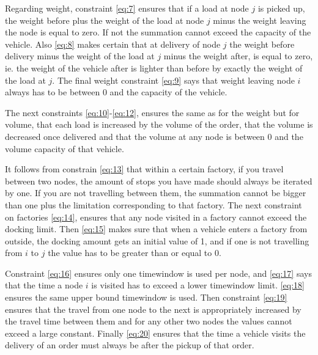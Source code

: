 \documentclass[../main.tex]{subfiles}
\begin{document}
Regarding weight, constraint \ref{eq:7} ensures that if a load at node $j$ is picked up, the weight before plus the weight of the load at node $j$ minus the weight leaving the node is equal to zero. If not the summation cannot exceed the capacity of the vehicle.
Also \ref{eq:8} makes certain that at delivery of node $j$ the weight before delivery minus the weight of the load at $j$ minus the weight after, is equal to zero, ie. the weight of the vehicle after is lighter than before by exactly the weight of the load at $j$. 
The final weight constraint \ref{eq:9} says that weight leaving node $i$ always has to be between $0$ and the capacity of the vehicle. \par

The next constraints \ref{eq:10}-\ref{eq:12}, ensures the same as for the weight but for volume, that each load is increased by the volume of the order, that the volume is decreased once delivered and that the volume at any node is between $0$ and the volume capacity of that vehicle.

It follows from constrain \ref{eq:13} that within a certain factory, if you travel between two nodes, the amount of stops you have made should always be iterated by one. 
If you are not travelling between them, the summation cannot be bigger than one plus the limitation corresponding to that factory.
The next constraint on factories \ref{eq:14}, ensures that any node visited in a factory cannot exceed the docking limit.
Then \ref{eq:15} makes sure that when a vehicle enters a factory from outside, the docking amount gets an initial value of 1, and if one is not travelling from $i$ to $j$ the value has to be greater than or equal to 0. \par

Constraint \ref{eq:16} ensures only one timewindow is used per node, and \ref{eq:17} says that the time a node $i$ is visited has to exceed a lower timewindow limit.
\ref{eq:18} ensures the same upper bound timewindow is used. 
Then constraint \ref{eq:19} ensures that the travel from one node to the next is appropriately increased by the travel time between them and for any other two nodes the values cannot exceed a large constant.
Finally \ref{eq:20} ensures that the time a vehicle visits the delivery of an order must always be after the pickup of that order. \par
\end{document}
